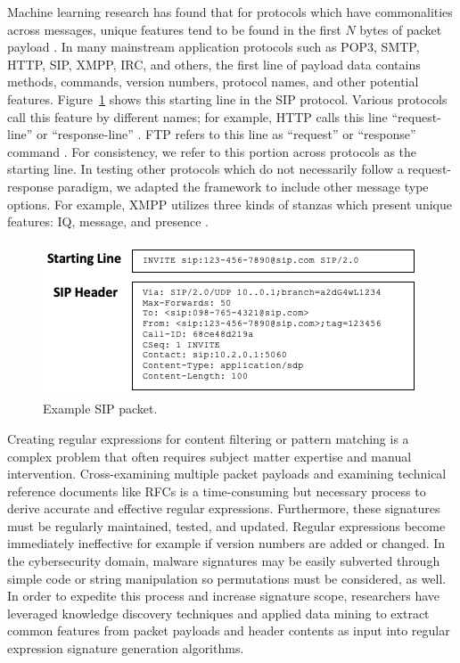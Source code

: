 Machine learning research has found that for protocols which have commonalities across messages, unique features tend to be found in the first $N$ bytes of packet payload \cite{wangxiang}. In many mainstream application protocols such as POP3, SMTP, HTTP, SIP, XMPP, IRC, and others, the first line of payload data contains methods, commands, version numbers, protocol names, and other potential features. Figure~\ref{f:sippacket} shows this starting line in the SIP protocol. Various protocols call this feature by different names; for example, HTTP calls this line ``request-line'' or ``response-line'' \cite{rfc2616}. FTP refers to this line as ``request'' or ``response'' command \cite{rfc959}. For consistency, we refer to this portion across protocols as the starting line. In testing other protocols which do not necessarily follow a request-response paradigm, we adapted the framework to include other message type options. For example, XMPP utilizes three kinds of stanzas which present unique features: IQ, message, and presence \cite{rfc6120}.

\begin{figure}[hbt!]
  \begin{center}
    \includegraphics[width=0.7\columnwidth]{chapters/3/img/SIPpacket.png}
    \caption{Example SIP packet.}
    \label{f:sippacket}
  \end{center}
\end{figure}


Creating regular expressions for content filtering or pattern matching  is a complex problem that often requires subject matter expertise and manual intervention. Cross-examining multiple packet payloads and examining technical reference documents like RFCs is a time-consuming but necessary process to derive accurate and effective regular expressions. Furthermore, these signatures must be regularly maintained, tested, and updated. Regular expressions become immediately ineffective for example if version numbers are added or changed. In the cybersecurity domain, malware signatures may be easily subverted through simple code or string manipulation so permutations must be considered, as well. In order to expedite this process and increase signature scope, researchers have leveraged knowledge discovery techniques and applied data mining to extract common features from packet payloads and header contents as input into regular expression signature generation algorithms.
